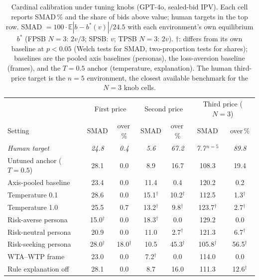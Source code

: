\begin{table}[t]
\centering
\small
\caption{Cardinal calibration under tuning knobs (GPT-4o, sealed-bid IPV). Each cell reports SMAD\,\% and the share of bids above value; human targets in the top row. SMAD $=100\cdot\mathbb{E}|b-b^{*}(v)|/24.5$ with each environment's own equilibrium $b^{*}$ (FPSB $N{=}3$: $2v/3$; SPSB: $v$; TPSB $N{=}3$: $2v$). $\dagger$: differs from its own baseline at $p<0.05$ (Welch tests for SMAD, two-proportion tests for shares); baselines are the pooled axis baselines (personas), the loss-aversion baseline (frames), and the $T{=}0.5$ anchor (temperature, explanation). The human third-price target is the \citet{kagel1993independent} $n{=}5$ environment, the closest available benchmark for the $N{=}3$ knob cells.}
\label{tab:cardinal}
\begin{tabular}{lcccccc}
\toprule
& \multicolumn{2}{c}{First price} & \multicolumn{2}{c}{Second price} & \multicolumn{2}{c}{Third price ($N{=}3$)} \\
Setting & SMAD & over\,\% & SMAD & over\,\% & SMAD & over\,\% \\
\midrule
\emph{Human target} & \emph{24.8} & \emph{0.4} & \emph{5.6} & \emph{67.2} & \emph{7.7}$^{\,n=5}$ & \emph{89.8} \\
\midrule
Untuned anchor ($T{=}0.5$)   & 28.1 & 0.0  & 8.9  & 16.7 & 108.3 & 19.4 \\
Axis-pooled baseline     & 23.4 & 0.0  & 11.4 & 0.4  & 120.2 & 0.2  \\
Temperature 0.1          & 28.6 & 0.0  & 15.1$^\dagger$ & 10.2$^\dagger$ & 112.5 & 1.3$^\dagger$ \\
Temperature 1.0          & 25.5 & 0.7  & 13.2$^\dagger$ & 9.8$^\dagger$  & 123.7$^\dagger$ & 2.7$^\dagger$ \\
Risk-averse persona      & 15.0$^\dagger$ & 0.0 & 18.3$^\dagger$ & 0.0 & 129.2 & 0.0 \\
Risk-neutral persona     & 20.9 & 0.0 & 11.0 & 2.7$^\dagger$ & 121.3 & 6.7$^\dagger$ \\
Risk-seeking persona     & 28.0$^\dagger$ & 18.0$^\dagger$ & 10.5 & 45.3$^\dagger$ & 105.8$^\dagger$ & 56.5$^\dagger$ \\
WTA--WTP frame           & 23.0 & 0.0  & 7.2$^\dagger$  & 0.0  & 114.0 & 0.0 \\
Rule explanation off     & 28.1 & 0.0  & 8.7  & 16.0 & 111.3 & 12.6$^\dagger$ \\
\bottomrule
\end{tabular}
\end{table}


